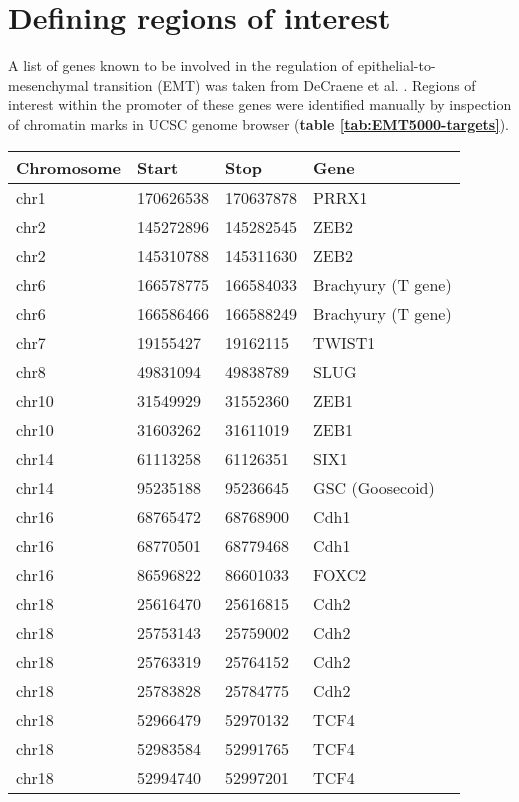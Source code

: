 \section{Defining regions of interest}
\label{Bioinf_methods: EMT5000 library}

A list of genes known to be involved in the regulation of epithelial-to-mesenchymal transition (EMT) was taken from DeCraene et al. \cite{DeCraene:2013kb}. Regions of interest within the promoter of these genes were identified manually by inspection of chromatin marks in UCSC genome browser (\textbf{table \ref{tab:EMT5000-targets}}). 

\begin{table}[H]
\begin{center}
\begin{footnotesize}
\begin{tabular}{llll}
\hline
Chromosome & Start & Stop & Gene \\
\hline
chr1 &	170626538 &	170637878 &	PRRX1 \\
chr2	& 145272896 & 145282545 & ZEB2 \\
chr2 &	145310788 & 145311630 & ZEB2 \\
chr6 &	166578775 & 166584033 & Brachyury (T gene) \\
chr6	& 166586466 & 166588249 & Brachyury (T gene) \\
chr7	& 19155427	 & 19162115 & TWIST1 \\
chr8	& 49831094	 & 49838789 & SLUG \\
chr10 & 31549929 & 31552360 & ZEB1 \\
chr10 & 31603262 & 31611019 & ZEB1 \\
chr14 & 61113258 & 61126351 & SIX1 \\
chr14 & 95235188 & 95236645 & GSC (Goosecoid) \\
chr16 & 68765472 & 68768900 & Cdh1 \\
chr16 & 68770501 & 68779468 & Cdh1 \\
chr16 & 86596822 & 86601033 & FOXC2 \\
chr18 & 25616470 & 25616815 & Cdh2 \\
chr18 & 25753143 & 25759002 & Cdh2 \\
chr18 & 25763319 & 25764152 & Cdh2 \\
chr18 & 25783828 & 25784775 & Cdh2 \\
chr18 & 52966479 & 52970132 & TCF4 \\
chr18 & 52983584 & 52991765 & TCF4 \\
chr18 & 52994740 & 52997201	& TCF4 \\

\end{tabular}
\end{footnotesize}
\end{center}
\end{table}
